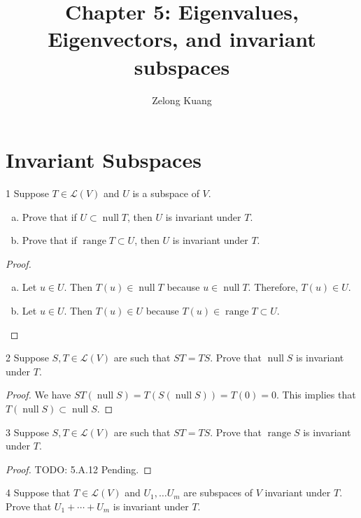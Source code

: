 \documentclass{article}
\title{\vspace{-2em}Chapter 5: Eigenvalues, Eigenvectors, and invariant subspaces}
\author{Zelong Kuang}
\newenvironment{problem}[1]{\begin{prob*}{#1}{}}{\end{prob*}}
\DeclareMathOperator{\Null}{null}
\DeclareMathOperator{\Range}{range}
\begin{document}
\maketitle

\newpage
\tableofcontents
\newpage

\section{Invariant Subspaces}

\begin{problem}{1}
Suppose $T \in \mathcal{L}(V)$ and $U$ is a subspace of $V$.
\begin{enumerate}[(a)]
	\item Prove that if $U \subset \Null T$, then $U$ is invariant under $T$.
	\item Prove that if $\Range T \subset U$, then $U$ is invariant under $T$.
\end{enumerate}
\end{problem}
\begin{proof}
	\begin{enumerate}[(a)]
		\item Let $u \in U$. Then $T(u) \in \Null T$ because $u \in \Null T$. Therefore, $T(u) \in U$.
		\item Let $u \in U$. Then $T(u) \in U$ because $T(u) \in \Range T \subset U$.
	\end{enumerate}
\end{proof}

\begin{problem}{2}
Suppose $S,T \in \mathcal{L}(V)$ are such that $ST = TS$. Prove that $\Null S$ is invariant under $T$.
\end{problem}

\begin{proof}
	We have $ST(\Null S) = T(S(\Null S)) = T(0) = 0$. This implies that $T(\Null S) \subset \Null S$.
\end{proof}

\begin{problem}{3}
Suppose $S,T \in \mathcal{L}(V)$ are such that $ST = TS$. Prove that $\Range S$ is invariant under $T$.
\end{problem}

\begin{proof}
	TODO: 5.A.12 Pending.
\end{proof}

\begin{problem}{4}
Suppose that $T \in \mathcal{L}(V)$ and $U_1, \ldots U_m$ are subspaces of $V$ invariant under $T$. Prove that $U_1 + \cdots + U_m$ is invariant under $T$.
\end{problem}
\end{document}

